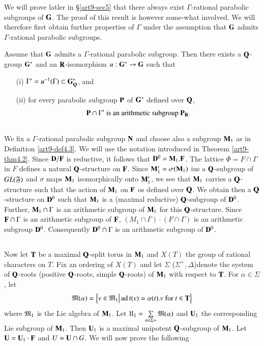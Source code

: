 We will prove latler in \S \ref{art9-sec5} that there always exist $\Gamma$-rational parabolic subgroups of $\mathbf{G}$. The proof of this result is however some-what involved. We will therefore first obtain further properties of $\Gamma$ under the assumption that $\mathbf{G}$ admits $\Gamma$-rational parabolic subgroups.
  
\begin{theorem}\label{art9-thm4.4}
Assume that $\mathbf{G}$ admits a $\Gamma$-rational parabolic subgroup. Then there exists a $\mathbf{Q}$-group $\mathbf{G}^\ast$ and an $\mathbf{R}$-isomorphism $u : \mathbf{G}^\ast \to \mathbf{G}$ such that 
\begin{itemize}
\item[(i)] $\Gamma' = u^{-1} (\Gamma) \subset \mathbf{G}^\ast_{\mathbf{Q}}$, and 

\item[(ii)] for every parabolic subgroup $\mathbf{P}$ of $\mathbf{G}^\ast$ defined over $\mathbf{Q}$,
$$
\mathbf{P} \cap \Gamma' \text{ is an arithmetic subgroup } \mathbf{P}_{\mathbf{R}}.
$$
\end{itemize}
\end{theorem}

\setcounter{subsection}{4}
\subsection{}\label{art9-subsec4.5}
We fix a $\Gamma$-rational parabolic subgroup $\mathbf{N}$ and choose also a subgroup $\mathbf{M}_1$ as in Definition \ref{art9-def4.3}. We  will use the notation introduced in Theorem \ref{art9-thm4.2}. Since $\mathbf{D}/\mathbf{F}$ is reductive, it follows that $\mathbf{D}^0 =\mathbf{M}_1. \mathbf{F}$. The lattice $\Phi= F \cap \Gamma$ in $F$ defines a natural $\mathbf{Q}$-structure on $\mathbf{F}$. Since $\mathbf{M}'_1 = \sigma (\mathbf{M}_1)$ ius a $\mathbf{Q}$-subgroup of $GL (\mathfrak{F})$ and $\sigma$ maps $\mathbf{M}_1$ isomorphically onto $\mathbf{M}'_1$, we see that $\mathbf{M}_1$ carries a $\mathbf{Q}$-structure such that the action of $\mathbf{M}_1$ on $\mathbf{F}$ os defined over $\mathbf{Q}$. We obtain then a $\mathbf{Q}$-structure on $\mathbf{D}^0$ such that $\mathbf{M}_1$ is a (maximal reductive) $\mathbf{Q}$-subgroup of $\mathbf{D}^0$. Further, $\mathbf{M}_1 \cap \Gamma$ is an arithmetic subgroup of $\mathbf{M}_1$ for this $\mathbf{Q}$-structure. Since $\mathbf{F} \cap \Gamma$ is an arithmetic subgroup of $\mathbf{F}$, $(M_1 \cap \Gamma) \cdot (F \cap \Gamma)$ is an arithmetic subgroup $\mathbf{D}^0$. Consequently $\mathbf{D}^0 \cap \Gamma$ is an arithmetic subgroup of $\mathbf{D}^0$.

\subsection{}\label{art9-subsec4.6}
Now let $\mathbf{T}$ be a maximal $\mathbf{Q}$-split torus in $\mathbf{M}_1$ and $X(T)$ the group of rational characters on $T$. Fix an ordering of $X(T)$ and let $\Sigma$ (\resp $\Sigma^+, \Delta$)\pageoriginale denote the system of $\mathbf{Q}$-roots (\resp positive $\mathbf{Q}$-roots, simple $\mathbf{Q}$-roots) of $\mathbf{M}_1$ with respect to $\mathbf{T}$. For $\alpha \in \Sigma$, let
$$
\mathfrak{M}(\alpha) = \left\{v \in \mathfrak{M}_1 \big| \operatorname{ad} t(v) = \alpha (t). v \text{ for } t \in \mathbf{T} \right\}
$$
where $\mathfrak{M}_1$ is the Lie algebra of $\mathbf{M}_1$. Let $\mathfrak{U}_1 = \sum\limits_{\alpha \in\Sigma +} \mathfrak{M}(\alpha)$ and $\mathbf{U}_1$ the corresponding Lie subgroup of $\mathbf{M}_1$. Then $\mathbf{U}_1$ is a maximal unipotent $\mathbf{Q}$-subgroup of $\mathbf{M}_1$. Let $\mathbf{U} = \mathbf{U}_1 \cdot \mathbf{F}$ and $U = \mathbf{U} \cap G$. We will now prove the following 


